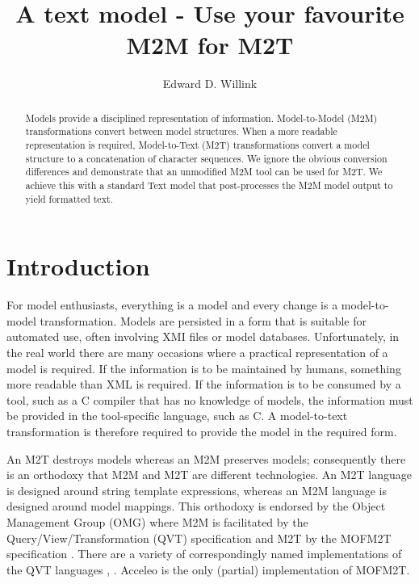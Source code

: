 \documentclass{llncs}
\begin{document}
%
\mainmatter              %
%
\title{A text model - Use your favourite M2M for M2T}
%
%
\author{Edward D. Willink}
%
%
%


\maketitle              %

\begin{abstract}
Models provide a disciplined representation of information. Model-to-Model (M2M) transformations convert between model structures. When a more readable representation is required, Model-to-Text (M2T) transformations convert a model structure to a concatenation of character sequences. We ignore the obvious conversion differences and demonstrate that an unmodified M2M tool can be used for M2T. We achieve this with a standard Text model that post-processes the M2M model output to yield formatted text. 

\end{abstract}
%
\section{Introduction}
%
For model enthusiasts, everything is a model and every change is a model-to-model transformation. Models are persisted in a form that is suitable for automated use, often involving XMI files or model databases. Unfortunately, in the real world there are many occasions where a practical representation of a model is required. If the information is to be maintained by humans, something more readable than XML is required. If the information is to be consumed by a tool, such as a C compiler that has no knowledge of models, the information must be provided in the tool-specific language, such as C. A model-to-text transformation is therefore required to provide the model in the required form.

An M2T destroys models whereas an M2M preserves models; consequently there is an orthodoxy that M2M and M2T are different technologies. An M2T language is designed around string template expressions, whereas an M2M language is designed around model mappings. This orthodoxy is endorsed by the Object Management Group (OMG) where M2M is facilitated by the Query/View/Transformation (QVT) specification \cite{QVT-1.3} and M2T by the MOFM2T specification \cite{MOFM2T-1.0}. There are a variety of correspondingly named implementations of the QVT languages \cite{Eclipse-QVTd}, \cite{Eclipse-QVTo}. Acceleo \cite{Eclipse-Acceleo} is the only (partial) implementation of MOFM2T.
\end{document}
